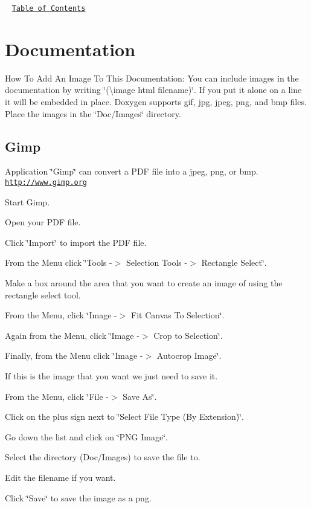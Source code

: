 ~\newline
\href{#Contents}{\tt Table of Contents}~\newline
 



\label{_Documentation}%
\hypertarget{index_Docs}{}\section{Documentation}\label{index_Docs}
How To Add An Image To This Documentation\+: You can include images in the documentation by writing \char`\"{}(\textbackslash{}image html filename)\char`\"{}. If you put it alone on a line it will be embedded in place. Doxygen supports gif, jpg, jpeg, png, and bmp files. Place the images in the \char`\"{}\+Doc/\+Images\char`\"{} directory.\hypertarget{index_Gimp}{}\subsection{Gimp}\label{index_Gimp}
Application \char`\"{}\+Gimp\char`\"{} can convert a P\+D\+F file into a jpeg, png, or bmp. \href{http://www.gimp.org}{\tt http\+://www.\+gimp.\+org}


\begin{DoxyItemize}
\item Start Gimp.
\item Open your P\+D\+F file.
\item Click \char`\"{}\+Import\char`\"{} to import the P\+D\+F file.
\item From the Menu click \char`\"{}\+Tools -\/$>$ Selection Tools -\/$>$ Rectangle Select\char`\"{}.
\item Make a box around the area that you want to create an image of using the rectangle select tool.
\item From the Menu, click \char`\"{}\+Image -\/$>$ Fit Canvas To Selection\char`\"{}.
\item Again from the Menu, click \char`\"{}\+Image -\/$>$ Crop to Selection\char`\"{}.
\item Finally, from the Menu click \char`\"{}\+Image -\/$>$ Autocrop Image\char`\"{}.
\item If this is the image that you want we just need to save it.
\item From the Menu, click \char`\"{}\+File -\/$>$ Save As\char`\"{}.
\item Click on the plus sign next to \char`\"{}\+Select File Type (\+By Extension)\char`\"{}.
\item Go down the list and click on \char`\"{}\+P\+N\+G Image\char`\"{}.
\item Select the directory (Doc/\+Images) to save the file to.
\item Edit the filename if you want.
\item Click \char`\"{}\+Save\char`\"{} to save the image as a png.
\end{DoxyItemize}

